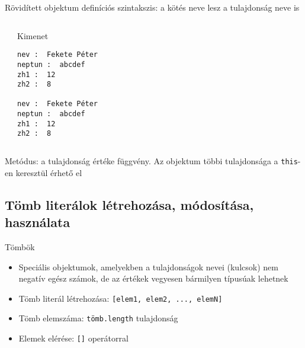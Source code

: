 \begin{frame}[fragile]
  Rövidített objektum definíciós szintakszis: a kötés neve lesz a tulajdonság neve is
  \scriptsize
  \begin{columns}[T]
      \begin{exampleblock}{}
        
      \end{exampleblock}
      \begin{block}{Kimenet}
        \begin{verbatim}
nev :  Fekete Péter
neptun :  abcdef
zh1 :  12
zh2 :  8

nev :  Fekete Péter
neptun :  abcdef
zh1 :  12
zh2 :  8
\end{verbatim}
      \end{block}
  \end{columns}
\end{frame}

\begin{frame}
  Metódus: a tulajdonság értéke függvény. Az objektum többi tulajdonsága a \texttt{this}-en keresztül érhető el
  \vfill
  \small
  \begin{exampleblock}{}
    
  \end{exampleblock}
\end{frame}

\subsection{Tömb literálok létrehozása, módosítása, használata}

\begin{frame}
  Tömbök
  \begin{itemize}
    \item Speciális objektumok, amelyekben a tulajdonságok nevei (kulcsok) nem negatív egész számok, de az értékek vegyesen bármilyen típusúak lehetnek
    \item Tömb literál létrehozása: \texttt{[elem1, elem2, ..., elemN]}
    \item Tömb elemszáma: \texttt{tömb.length} tulajdonság
    \item Elemek elérése: \texttt{[]} operátorral
  \end{itemize}
  \footnotesize
  \begin{exampleblock}{}
    \vspace{-0.2cm}
    
    \vspace{-0.2cm}
  \end{exampleblock}
\end{frame}

